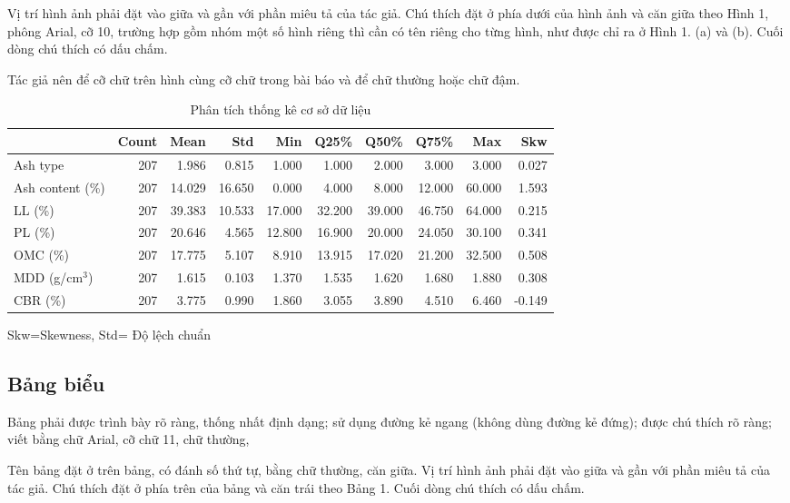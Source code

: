 \documentclass[10pt]{article}
\begin{document}
\begin{multicols}{2}
Vị trí hình ảnh phải đặt vào giữa và gần với phần miêu tả của tác giả.
Chú thích đặt ở phía dưới của hình ảnh và căn giữa theo Hình 1, phông
Arial, cỡ 10, trường hợp gồm nhóm một số hình riêng thì cần có tên
riêng cho từng hình, như được chỉ ra ở Hình 1. (a) và (b). Cuối dòng
chú thích có dấu chấm.

Tác giả nên để cỡ chữ trên hình cùng cỡ chữ trong bài báo và để chữ
thường hoặc chữ đậm.

\begin{table}[!ht]
\centering
\caption{Phân tích thống kê cơ sở dữ liệu}
\fontsize{7}{8.5}\selectfont
\setlength{\tabcolsep}{2.5pt}
\begin{tabular}{lrrrrrrrrr}
\toprule
 & Count & Mean & Std & Min & Q25\% & Q50\% & Q75\% & Max & Skw \\
\midrule
Ash type & 207 & 1.986 & 0.815 & 1.000 & 1.000 & 2.000 & 3.000 & 3.000 & 0.027 \\
Ash content (\%) & 207 & 14.029 & 16.650 & 0.000 & 4.000 & 8.000 & 12.000 & 60.000 & 1.593 \\
LL (\%) & 207 & 39.383 & 10.533 & 17.000 & 32.200 & 39.000 & 46.750 & 64.000 & 0.215 \\
PL (\%) & 207 & 20.646 & 4.565 & 12.800 & 16.900 & 20.000 & 24.050 & 30.100 & 0.341 \\
OMC (\%) & 207 & 17.775 & 5.107 & 8.910 & 13.915 & 17.020 & 21.200 & 32.500 & 0.508 \\
MDD (g/cm$^3$) & 207 & 1.615 & 0.103 & 1.370 & 1.535 & 1.620 & 1.680 & 1.880 & 0.308 \\
CBR (\%) & 207 & 3.775 & 0.990 & 1.860 & 3.055 & 3.890 & 4.510 & 6.460 & -0.149 \\
\bottomrule
\end{tabular}
\vspace{2pt}
\raggedright
{\fontsize{7}{8.5}\selectfont Skw=Skewness, Std= Độ lệch chuẩn}
\end{table}

\subsection{Bảng biểu}

Bảng phải được trình bày rõ ràng, thống nhất định dạng; sử dụng đường
kẻ ngang (không dùng đường kẻ đứng); được chú thích rõ ràng; viết bằng
chữ Arial, cỡ chữ 11, chữ thường,

Tên bảng đặt ở trên bảng, có đánh số thứ tự, bằng chữ thường, căn
giữa. Vị trí hình ảnh phải đặt vào giữa và gần với phần miêu tả của
tác giả. Chú thích đặt ở phía trên của bảng và căn trái theo Bảng 1.
Cuối dòng chú thích có dấu chấm.


\end{multicols}
\end{document}
